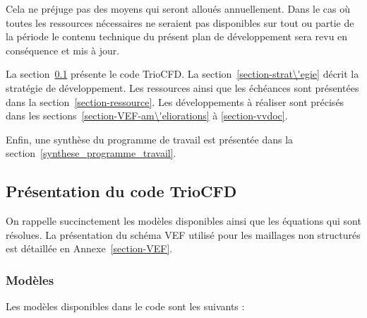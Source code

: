 Cela ne pr\'ejuge pas des moyens qui seront allou\'es annuellement. Dans le cas o\`u toutes les ressources n\'ecessaires ne seraient pas disponibles sur tout ou partie de la p\'eriode le contenu technique du pr\'esent plan de d\'eveloppement sera revu en cons\'equence et mis \`a jour. 

La section~\ref{Pres-Trio} pr\'esente le code TrioCFD. La section~\ref{section-strat\'egie} d\'ecrit la strat\'egie de d\'eveloppement. Les ressources ainsi que les \'ech\'eances sont pr\'esent\'ees dans la section~\ref{section-ressource}.
Les d\'eveloppements \`a r\'ealiser sont pr\'ecis\'es dans les sections~\ref{section-VEF-am\'eliorations} \`a \ref{section-vvdoc}. 

Enfin, une synth\`ese du programme de travail est pr\'esent\'ee dans la section~\ref{synthese_programme_travail}.


\subsection{Pr\'esentation du code TrioCFD}
\label{Pres-Trio}

On rappelle succinctement les mod\`eles disponibles ainsi que les \'equations qui sont r\'esolues. La pr\'esentation du sch\'ema VEF utilis\'e pour les maillages non structur\'es est d\'etaill\'ee en Annexe~\ref{section-VEF}.

\subsubsection{Mod\`eles}

Les mod\`eles disponibles dans le code sont les suivants :

